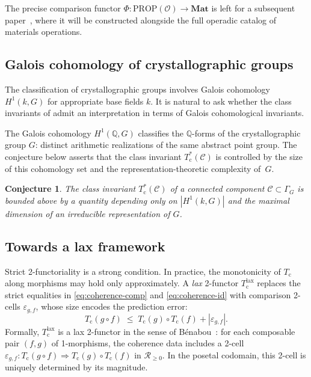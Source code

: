 \documentclass[12pt,a4paper]{article}
\theoremstyle{plain}
\newtheorem{conjecture}[theorem]{Conjecture}
\theoremstyle{definition}
\theoremstyle{remark}
\newcommand{\Tc}{T_{\mathrm{c}}}
\newcommand{\Matl}{\mathbf{Mat}}
\begin{document}
The precise comparison functor
$\Phi \colon \mathrm{PROP}(\mathcal{O}) \to \Matl$ is left for a
subsequent paper~\cite{placeholder_operad}, where it will be constructed
alongside the full operadic catalog of materials operations.

\subsection{Galois cohomology of crystallographic groups}

The classification of crystallographic groups involves Galois cohomology
$H^1(k, G)$ for appropriate base fields $k$.  It is natural to ask whether
the class invariants of  admit an interpretation in
terms of Galois cohomological invariants.

The Galois cohomology $H^1(\mathbb{Q}, G)$ classifies the $\mathbb{Q}$-forms
of the crystallographic group $G$: distinct arithmetic realizations of
the same abstract point group.  The conjecture below asserts that the
class invariant $\Tc^*(\mathcal{C})$ is controlled by the size of this
cohomology set and the representation-theoretic complexity of~$G$.

\begin{conjecture}\label{conj:galois}
The class invariant $\Tc^*(\mathcal{C})$ of a connected component
$\mathcal{C} \subset \Gamma_G$ is bounded above by a quantity depending
only on $|H^1(k, G)|$ and the maximal dimension of an irreducible
representation of $G$.
\end{conjecture}

\subsection{Towards a lax framework}\label{subsec:lax-discussion}

Strict 2-functoriality is a strong condition.  In practice, the
monotonicity of $\Tc$ along morphisms may hold only approximately.  A
\emph{lax} 2-functor $\Tc^{\mathrm{lax}}$ replaces the strict
equalities in \eqref{eq:coherence-comp} and \eqref{eq:coherence-id} with
comparison 2-cells $\varepsilon_{g,f}$, whose size encodes the prediction
error:
\[
  \Tc(g \circ f) \;\leq\; \Tc(g) \circ \Tc(f) + |\varepsilon_{g,f}|.
\]
Formally, $\Tc^{\mathrm{lax}}$ is a lax 2-functor in the sense of
B\'{e}nabou~\cite{placeholder_Benabou}: for each composable pair
$(f, g)$ of 1-morphisms, the coherence data includes a 2-cell
$\varepsilon_{g,f} \colon \Tc(g \circ f) \Rightarrow \Tc(g) \circ \Tc(f)$
in $\mathscr{R}_{\geq 0}$.  In the posetal codomain, this 2-cell is
uniquely determined by its magnitude.
\end{document}
